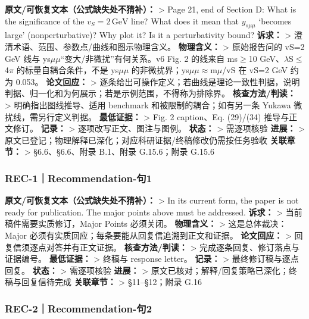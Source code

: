 \documentclass[
  chinese,
  UTF8]{ctexart}
\begin{document}
\textbf{原文/可恢复文本（公式缺失处不猜补）：} \textgreater{} Page 21,
end of Section D: What is the significance of the
\(v_S=2\,\mathrm{GeV}\) line? What does it mean that \(y_{s\mu\mu}\)
`becomes large' (nonperturbative)? Why plot it? Is it a perturbativity
bound? \textbf{诉求：} \textgreater{}
澄清术语、范围、参数点/曲线和图示物理含义。 \textbf{物理含义：}
\textgreater{} 原始报告问的 vS=2 GeV 线与
ys\ensuremath{\mu}\ensuremath{\mu}``变大/非微扰''有何关系。v6 Fig. 2
的线来自 ms\ensuremath{\geq}10
GeV、\ensuremath{\lambda}S\ensuremath{\leq}4\ensuremath{\pi}
的标量自耦合条件，不是 ys\ensuremath{\mu}\ensuremath{\mu}
的非微扰界；ys\ensuremath{\mu}\ensuremath{\mu}\ensuremath{\approx}m\ensuremath{\mu}/vS
在 vS=2 GeV 约为 0.053。 \textbf{论文回应：} \textgreater{}
逐条给出可操作定义；若曲线是理论一致性判据，说明判据、归一化和为何展示；若是示例范围，不得称为排除界。
\textbf{核查方法/判读：} \textgreater{} 明确指出图线推导、适用 benchmark
和被限制的耦合；如有另一条 Yukawa 微扰线，需另行定义判据。
\textbf{最低证据：} \textgreater{} Fig. 2 caption、Eq. (29)/(34)
推导与正文修订。 \textbf{记录：} \textgreater{}
逐项改写正文、图注与图例。 \textbf{状态：} \textgreater{} 需逐项核验
\textbf{进展：} \textgreater{}
原文已登记；物理解释已深化；对应科研证据/终稿修改仍需按任务验收
\textbf{关联章节：} \textgreater{} §6.6、§6.6、附录 B.1、附录
G.15.6；附录 G.15.6

\subsubsection{REC-1｜Recommendation-句1}\label{rec-1recommendation-ux53e51}

\textbf{原文/可恢复文本（公式缺失处不猜补）：} \textgreater{} In its
current form, the paper is not ready for publication. The major points
above must be addressed. \textbf{诉求：} \textgreater{}
当前稿件需要实质修订，Major Points 必须关闭。 \textbf{物理含义：}
\textgreater{} 这是总体裁决：Major
必须有实质回应；每条要能从回复信追溯到正文和证据。 \textbf{论文回应：}
\textgreater{} 回复信须逐点对答并有正文证据。 \textbf{核查方法/判读：}
\textgreater{} 完成逐条回复、修订落点与证据编号。 \textbf{最低证据：}
\textgreater{} 终稿与 response letter。 \textbf{记录：} \textgreater{}
最终修订稿与逐点回复。 \textbf{状态：} \textgreater{} 需逐项核验
\textbf{进展：} \textgreater{}
原文已核对；解释/回复策略已深化；终稿与回复信待完成 \textbf{关联章节：}
\textgreater{} §11--§12；附录 G.16

\subsubsection{REC-2｜Recommendation-句2}\label{rec-2recommendation-ux53e52}
\end{document}
